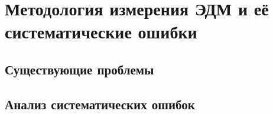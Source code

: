 \chapter{Методология измерения ЭДМ и её систематические ошибки}





\section{Существующие проблемы}


\section{Анализ систематических ошибок} \label{sec:systematic_error}




